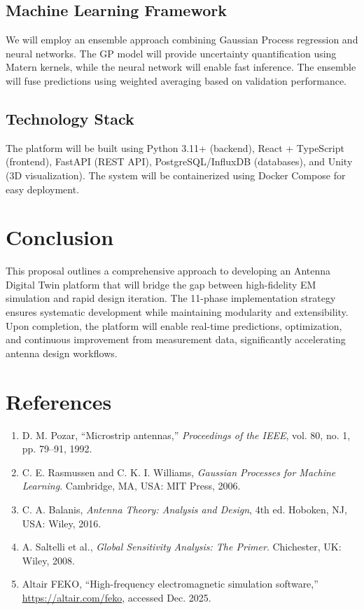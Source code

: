 \documentclass[11pt]{article}
\begin{document}
\subsection{Machine Learning Framework}
We will employ an ensemble approach combining Gaussian Process regression and neural networks. The GP model will provide uncertainty quantification using Matern kernels, while the neural network will enable fast inference. The ensemble will fuse predictions using weighted averaging based on validation performance.

\subsection{Technology Stack}
The platform will be built using Python 3.11+ (backend), React + TypeScript (frontend), FastAPI (REST API), PostgreSQL/InfluxDB (databases), and Unity (3D visualization). The system will be containerized using Docker Compose for easy deployment.

\section{Conclusion}

This proposal outlines a comprehensive approach to developing an Antenna Digital Twin platform that will bridge the gap between high-fidelity EM simulation and rapid design iteration. The 11-phase implementation strategy ensures systematic development while maintaining modularity and extensibility. Upon completion, the platform will enable real-time predictions, optimization, and continuous improvement from measurement data, significantly accelerating antenna design workflows.

\section*{References}
\begin{enumerate}
    \item D. M. Pozar, ``Microstrip antennas,'' \emph{Proceedings of the IEEE}, vol. 80, no. 1, pp. 79--91, 1992.
    \item C. E. Rasmussen and C. K. I. Williams, \emph{Gaussian Processes for Machine Learning}. Cambridge, MA, USA: MIT Press, 2006.
    \item C. A. Balanis, \emph{Antenna Theory: Analysis and Design}, 4th ed. Hoboken, NJ, USA: Wiley, 2016.
    \item A. Saltelli et al., \emph{Global Sensitivity Analysis: The Primer}. Chichester, UK: Wiley, 2008.
    \item Altair FEKO, ``High-frequency electromagnetic simulation software,'' \url{https://altair.com/feko}, accessed Dec. 2025.
\end{enumerate}
\end{document}
